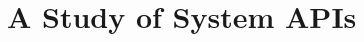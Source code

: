 \chapter{A Study of System APIs}
\label{chap:study}


\makeatletter
{}
\makeatother
\graphicspath{{study/figures/}}




%


\makeatletter
{}
\makeatother
\graphicspath{{}}
